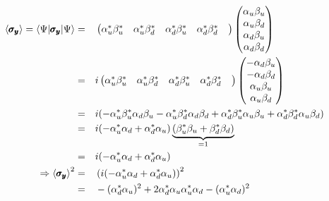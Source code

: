 \documentclass[solutions.tex]{subfiles}
\begin{document}
\begin{equation*}\begin{aligned}
	\left\langle \pmb{\sigma_y} \right\rangle = \langle \Psi|\pmb{\sigma_y}|\Psi\rangle
		&=&& \begin{pmatrix}
			\alpha_u^*\beta_u^* &
			\alpha_u^*\beta_d^* &
			\alpha_d^*\beta_u^* &
			\alpha_d^*\beta_d^* &
		\end{pmatrix}\begin{pmatrix}
			\alpha_u\beta_u \\
			\alpha_u\beta_d \\
			\alpha_d\beta_u \\
			\alpha_d\beta_d \\
		\end{pmatrix} \\
	~ &=&& i\begin{pmatrix}
			\alpha_u^*\beta_u^* &
			\alpha_u^*\beta_d^* &
			\alpha_d^*\beta_u^* &
			\alpha_d^*\beta_d^* &
		\end{pmatrix}\begin{pmatrix}
			-\alpha_d\beta_u \\
			-\alpha_d\beta_d \\
			\alpha_u\beta_u \\
			\alpha_u\beta_d \\
		\end{pmatrix} \\
	~ &=&&i(-\alpha_u^*\beta_u^*\alpha_d\beta_u
		-\alpha_u^*\beta_d^*\alpha_d\beta_d
		+\alpha_d^*\beta_u^*\alpha_u\beta_u
		+\alpha_d^*\beta_d^*\alpha_u\beta_d) \\
	~ &=&&i(-\alpha_u^*\alpha_d+\alpha_d^*\alpha_u)
		\underbrace{(\beta_u^*\beta_u+\beta_d^*\beta_d)}_{=1} \\
	~ &=&&i(-\alpha_u^*\alpha_d+\alpha_d^*\alpha_u) \\
	\Rightarrow\left\langle \pmb{\sigma_y} \right\rangle^2 &=&&
		\left(i(-\alpha_u^*\alpha_d+\alpha_d^*\alpha_u)\right)^2 \\
	~ &=&& -(\alpha_d^*\alpha_u)^2 +2\alpha_d^*\alpha_u\alpha_u^*\alpha_d
		-(\alpha_u^*\alpha_d)^2
\end{aligned}\end{equation*}
\end{document}
